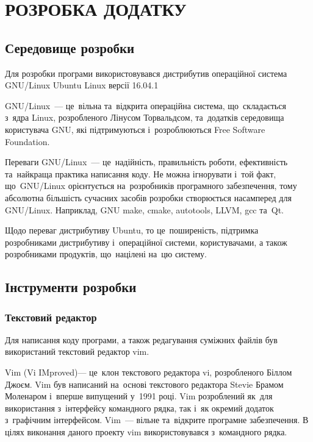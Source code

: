 \documentclass[a4paper,oneside,titlepage,14pt]{extarticle}
\begin{document}
	\section{РОЗРОБКА ДОДАТКУ}
		\subsection{Середовище розробки}
				Для розробки програми використовувався дистрибутив операційної система GNU/Linux Ubuntu Linux версії 16.04.1\par
				GNU/Linux~--- це~вільна та~відкрита операційна система, що~складається з~ядра Linux, розробленого Лінусом Торвальдсом, та~додатків середовища користувача GNU, які підтримуються і~розроблюються Free Software Foundation.\par
				Переваги GNU/Linux~--- це~надійність, правильність роботи, ефективність та~найкраща практика написання коду. Не можна ігнорувати і~той факт, що~GNU/Linux орієнтується на~розробників програмного забезпечення, тому абсолютна більшість сучасних засобів розробки створюється насамперед для GNU/Linux. Наприклад, GNU make, cmake, autotools, LLVM, gcc та~Qt.\par
				Щодо переваг дистрибутиву Ubuntu, то це~поширеність, підтримка розробниками дистрибутиву і~операційної системи, користувачами, а також розробниками продуктів, що~націлені на~цю систему.\par
			\subsection{Інструменти розробки}
				\subsubsection{Текстовий редактор}
					Для написання коду програми, а також редагування суміжних файлів був використаний текстовий редактор vim.\par
					Vim (Vi IMproved)--- це~клон текстового редактора vi, розробленого Біллом Джоєм. Vim був написаний на~основі текстового редактора Stevie Брамом Моленаром і~вперше випущений у~1991 році. Vim розроблений як~для використання з~інтерфейсу командного рядка, так і~як окремий додаток з~графічним інтерфейсом. Vim~--- вільне та~відкрите програмне забезпечення. В цілях виконання даного проекту vim використовувався з~командного рядка.\par
\end{document}
